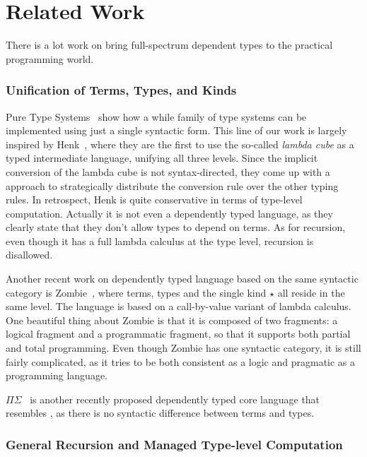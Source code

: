 \section{Related Work}
\label{sec:related}

There is a lot work on bring full-spectrum dependent types to the
practical programming world.

\subsubsection{Unification of Terms, Types, and Kinds}
 

Pure Type Systems~\cite{pts} show how a while family of type systems
can be implemented using just a single syntactic form. This line of
our work is largely inspired by Henk~\cite{pts:henk}, where they are
the first to use the so-called \emph{lambda cube} as a typed
intermediate language, unifying all three levels. Since the implicit
conversion of the lambda cube is not syntax-directed, they come up
with a approach to strategically distribute the conversion rule over
the other typing rules. In retrospect, Henk is quite conservative in
terms of type-level computation. Actually it is not even a dependently
typed language, as they clearly state that they don't allow types to
depend on terms. As for recursion, even though it has a full lambda
calculus at the type level, recursion is disallowed.

Another recent work on dependently typed language based on the same
syntactic category is \textsf{Zombie}~\cite{zombie:popl14,
  zombie:thesis}, where terms, types and the single kind $\star$ all
reside in the same level. The language is based on a call-by-value
variant of lambda calculus. One beautiful thing about Zombie is that
it is composed of two fragments: a logical fragment and a programmatic
fragment, so that it supports both partial and total programming. Even
though Zombie has one syntactic category, it is still fairly
complicated, as it tries to be both consistent as a logic and
pragmatic as a programming language.

$\Pi\Sigma$~\cite{dep:pisigma} is another recently proposed
dependently typed core language that resembles \name, as there is no
syntactic difference between terms and types.\bruno{}


\subsubsection{General Recursion and Managed Type-level Computation}

